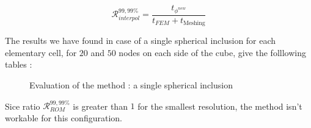 {\begin{equation}
\label{eval_interp}
\mathcal{R}_{interpol}^{99,99\%}=\dfrac{t_{\phi^{new}}}{t_{FEM}+t_{\text{Meshing}}}
\end{equation}

The results we have found in case of a single spherical inclusion for each elementary cell, for $20$ and $50$ nodes on each side of the cube, give the folllowing tables :

\begin{figure}[H]%
%
\begin{table}[H]
\begin{center}
%
%
\qquad
{}%
%
\end{center}
\end{table}
%
\caption{Evaluation of the method : a single spherical inclusion}
\end{figure}

\etoile
\newlength{\currentparskip}
\setlength{\currentparskip}{\parskip}
\begin{minipage}{\linewidth}
\setlength{\parskip}{\currentparskip}
Sice ratio $\mathcal{R}_{ROM}^{99,99\%}$ is greater than $1$ for the smallest resolution, %
the method isn't workable for this configuration.


\end{minipage}}
